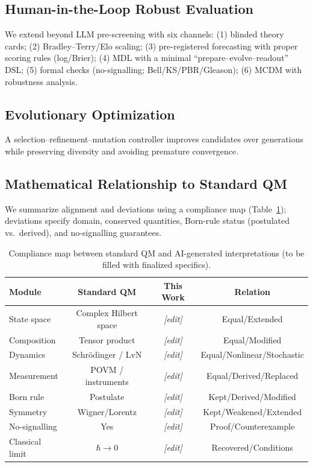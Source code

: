 \documentclass[11pt]{article}
\begin{document}
\subsection{Human-in-the-Loop Robust Evaluation}
We extend beyond LLM pre-screening with six channels: (1) blinded theory cards; (2) Bradley--Terry/Elo scaling; (3) pre-registered forecasting with proper scoring rules (log/Brier); (4) MDL with a minimal ``prepare--evolve--readout'' DSL; (5) formal checks (no-signalling; Bell/KS/PBR/Gleason); (6) MCDM with robustness analysis.

\subsection{Evolutionary Optimization}
A selection--refinement--mutation controller improves candidates over generations while preserving diversity and avoiding premature convergence.

\subsection{Mathematical Relationship to Standard QM}
We summarize alignment and deviations using a compliance map (Table~\ref{tab:compliance}); deviations specify domain, conserved quantities, Born-rule status (postulated vs.\ derived), and no-signalling guarantees.
\begin{table}[t]
\centering
\small
\caption{Compliance map between standard QM and AI-generated interpretations (to be filled with finalized specifics).}
\label{tab:compliance}
\begin{tabular}{lccc}
\toprule
Module & Standard QM & This Work & Relation \\
\midrule
State space & Complex Hilbert space & \textit{[edit]} & Equal/Extended \\
Composition & Tensor product & \textit{[edit]} & Equal/Modified \\
Dynamics & Schr\"odinger / LvN & \textit{[edit]} & Equal/Nonlinear/Stochastic \\
Measurement & POVM / instruments & \textit{[edit]} & Equal/Derived/Replaced \\
Born rule & Postulate & \textit{[edit]} & Kept/Derived/Modified \\
Symmetry & Wigner/Lorentz & \textit{[edit]} & Kept/Weakened/Extended \\
No-signalling & Yes & \textit{[edit]} & Proof/Counterexample \\
Classical limit & $\hbar\!\to\!0$ & \textit{[edit]} & Recovered/Conditions \\
\bottomrule
\end{tabular}
\end{table}
\end{document}
